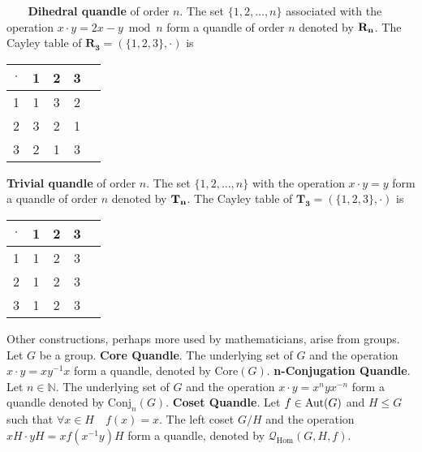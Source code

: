 \begin{example} \cite{bianco2021connected, JOYCE198237,lopes2006finite}\label{quandleConst}\textcolor{white}{line}\newline
\textbf{Dihedral quandle} of order $n$. The set $\{1,2,\dots,n\}$ associated with the operation  $x \cdot y = 2x-y \bmod n$ form a quandle of order $n$ denoted by $\mathbf{R_n}$. \newline
The Cayley table of $\mathbf{R_3} = (\{1,2,3\}, \cdot)$ is
\begin{center}
    \begin{tabular}{c|c c c c}
         $\cdot$ & 1 & 2 & 3 \\
         \hline
          1 & 1 & 3 & 2\\
          2 & 3 & 2 & 1\\
          3 & 2 & 1 & 3
    \end{tabular}
\end{center}


 
\noindent \textbf{Trivial quandle} of order $n$. The set $\{1,2,\dots,n\}$ with the operation  $x \cdot y = y$ form a quandle of order $n$ denoted by $\mathbf{T_n}$.\newline
The Cayley table of $\mathbf{T_3} = (\{1,2,3\}, \cdot)$ is
\begin{center}
    \begin{tabular}{c|c c c c}
         $\cdot$ & 1 & 2 & 3 \\
         \hline
          1 & 1 & 2 & 3\\
          2 & 1 & 2 & 3\\
          3 & 1 & 2 & 3
    \end{tabular}
\end{center}
Other constructions, perhaps more used by mathematicians, arise from groups. \newline\newline
Let $G$ be a group.\newline\newline
\textbf{Core Quandle}. The underlying set of $G$ and the operation $x \cdot y = xy^{-1}x$ form a quandle, denoted by $\text{Core}(G)$.\newline\newline
\textbf{n-Conjugation Quandle}. 
    Let $n \in \mathbb{N}$. The underlying set of  $G$ and the operation $x \cdot y = x^nyx^{-n}$ form a quandle denoted by $\text{Conj}_n(G)$.\newline\newline
\textbf{Coset Quandle}. Let $f \in \operatorname{Aut}(G)$ and  $H \leq G$ such that $\forall x \in H\quad f(x)=x$.\newline
The left coset $G/H$ and the operation $xH \cdot yH = xf(x^{-1}y)H$ form a quandle, denoted by  $\mathcal{Q}_{\text{Hom}}(G,H,f)$.

\end{example}



